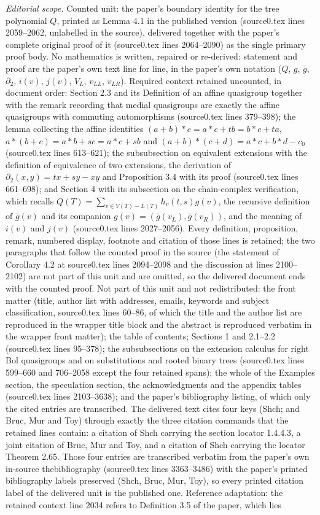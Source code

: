 \documentclass[10pt,a4paper]{amsart}
\theoremstyle{definition}
\begin{document}
\noindent\textit{Editorial scope.} Counted unit: the paper's boundary identity for the tree polynomial $Q$, printed as Lemma 4.1 in the published version (source0.tex lines 2059--2062, unlabelled in the source), delivered together with the paper's complete original proof of it (source0.tex lines 2064--2090) as the single primary proof body. No mathematics is written, repaired or re-derived: statement and proof are the paper's own text line for line, in the paper's own notation ($Q$, $g$, $\bar g$, $\partial_2$, $i(v)$, $j(v)$, $V_L$, $v_{LL}$, $v_{LR}$). Required context retained uncounted, in document order: Section 2.3 and its Definition of an affine quasigroup together with the remark recording that medial quasigroups are exactly the affine quasigroups with commuting automorphisms (source0.tex lines 379--398); the lemma collecting the affine identities $(a+b)*c=a*c+tb=b*c+ta$, $a*(b+c)=a*b+sc=a*c+sb$ and $(a+b)*(c+d)=a*c+b*d-c_0$ (source0.tex lines 613--621); the subsubsection on equivalent extensions with the definition of equivalence of two extensions, the derivation of $\partial_2(x,y)=tx+sy-xy$ and Proposition 3.4 with its proof (source0.tex lines 661--698); and Section 4 with its subsection on the chain-complex verification, which recalls $Q(T)=\sum_{v\in V(T)-L(T)} h_v(t,s)g(v)$, the recursive definition of $\bar g(v)$ and its companion $g(v)=(\bar g(v_L),\bar g(v_R))$, and the meaning of $i(v)$ and $j(v)$ (source0.tex lines 2027--2056). Every definition, proposition, remark, numbered display, footnote and citation of those lines is retained; the two paragraphs that follow the counted proof in the source (the statement of Corollary 4.2 at source0.tex lines 2094--2098 and the discussion at lines 2100--2102) are not part of this unit and are omitted, so the delivered document ends with the counted proof. Not part of this unit and not redistributed: the front matter (title, author list with addresses, emails, keywords and subject classification, source0.tex lines 60--86, of which the title and the author list are reproduced in the wrapper title block and the abstract is reproduced verbatim in the wrapper front matter); the table of contents; Sections 1 and 2.1--2.2 (source0.tex lines 95--378); the subsubsections on the extension calculus for right Bol quasigroups and on substitutions and rooted binary trees (source0.tex lines 599--660 and 706--2058 except the four retained spans); the whole of the Examples section, the speculation section, the acknowledgments and the appendix tables (source0.tex lines 2103--3638); and the paper's bibliography listing, of which only the cited entries are transcribed. The delivered text cites four keys (Shch; and Bruc, Mur and Toy) through exactly the three citation commands that the retained lines contain: a citation of Shch carrying the section locator 1.4.4.3, a joint citation of Bruc, Mur and Toy, and a citation of Shch carrying the locator Theorem 2.65. Those four entries are transcribed verbatim from the paper's own in-source thebibliography (source0.tex lines 3363--3486) with the paper's printed bibliography labels preserved (Shch, Bruc, Mur, Toy), so every printed citation label of the delivered unit is the published one. Reference adaptation: the retained context line 2034 refers to Definition 3.5 of the paper, which lies 
\end{document}
